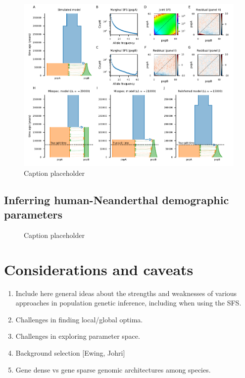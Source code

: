 \documentclass[]{article}
\begin{document}
\begin{figure}[t!]
    \includegraphics{../example1/fig1.pdf}
    \caption{Caption placeholder}
    \label{fig:im}
\end{figure}

\subsection*{Inferring human-Neanderthal demographic parameters}

\begin{figure}[t!]
    \caption{Caption placeholder}
    \label{fig:humans}
\end{figure}


\section*{Considerations and caveats}\label{sec:conclusions}

\begin{enumerate}
    \item Include here general ideas about the strengths and weaknesses of
        various approaches in population genetic inference, including when
        using the SFS.
    \item Challenges in finding local/global optima.
    \item Challenges in exploring parameter space.
    \item Background selection [Ewing, Johri]
    \item Gene dense vs gene sparse genomic architectures among species.
\end{enumerate}



\end{document}

